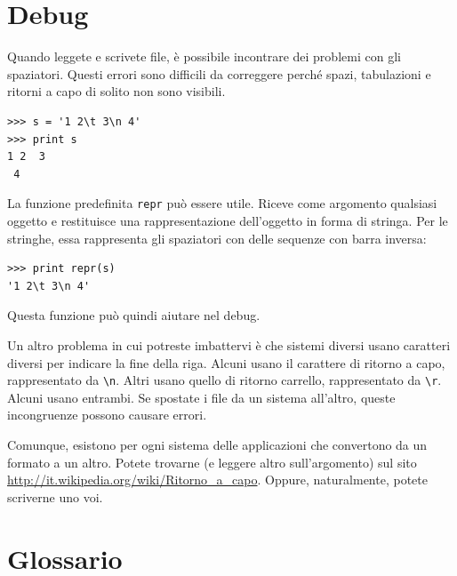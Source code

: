 \documentclass[10pt]{book}
\begin{document}
\section{Debug}

Quando leggete e scrivete file, è possibile incontrare dei problemi con gli spaziatori. Questi errori sono difficili da correggere perché spazi, tabulazioni e ritorni a capo di solito non sono visibili.

\begin{verbatim}
>>> s = '1 2\t 3\n 4'
>>> print s
1 2	 3
 4
\end{verbatim}

La funzione predefinita {\tt repr} può essere utile. Riceve come argomento qualsiasi oggetto e restituisce una rappresentazione dell'oggetto in forma di stringa. Per le stringhe, essa rappresenta gli spaziatori con delle sequenze con barra inversa:

\begin{verbatim}
>>> print repr(s)
'1 2\t 3\n 4'
\end{verbatim}

Questa funzione può quindi aiutare nel debug.

Un altro problema in cui potreste imbattervi è che sistemi diversi usano caratteri diversi per indicare la fine della riga. Alcuni usano il carattere di ritorno a capo, rappresentato da \verb"\n".  Altri usano quello di ritorno carrello, rappresentato da \verb"\r".  Alcuni usano entrambi. Se spostate i file da un sistema all'altro, queste incongruenze possono causare errori.

Comunque, esistono per ogni sistema delle applicazioni che convertono da un formato a un altro. Potete trovarne (e leggere altro sull'argomento) sul sito \url{http://it.wikipedia.org/wiki/Ritorno_a_capo}.  Oppure, naturalmente, potete scriverne uno voi.


\section{Glossario}
\end{document}
